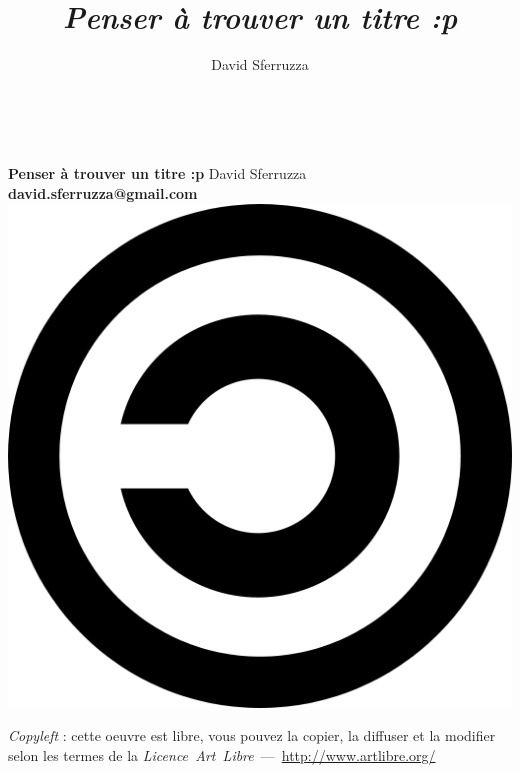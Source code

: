 \documentclass[12pt,a4paper,twoside,openany]{report}
\author{David Sferruzza}
\title{\textit{Penser à trouver un titre :p}}
\date{}
\begin{document}
\maketitle

\begin{titlepage}
~\vfill
\begin{center}
\begin{minipage}[c]{10cm}
\begin{center}
\textbf{Penser à trouver un titre :p}
\linebreak
\linebreak
David Sferruzza\\
\textbf{david.sferruzza@gmail.com}
\linebreak
{}
\linebreak
\linebreak
\linebreak
\includegraphics[scale=.05]{images/copyleft.png} 
\end{center}
\textit{Copyleft} : cette oeuvre est libre, vous pouvez la copier,
la diffuser et la modifier selon les termes de la
\textit{Licence~Art~Libre}~---~\url{http://www.artlibre.org/}
\end{minipage}
\end{center}
\vfill
\end{titlepage}

\tableofcontents






\end{document}

